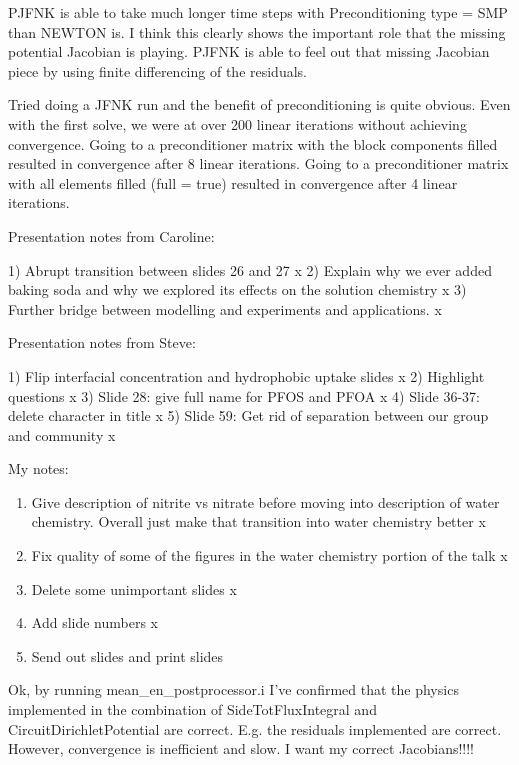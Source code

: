 {PJFNK is able to take much longer time steps with Preconditioning type = SMP than NEWTON is. I think this clearly shows the important role that the missing potential Jacobian is playing. PJFNK is able to feel out that missing Jacobian piece by using finite differencing of the residuals.

Tried doing a JFNK run and the benefit of preconditioning is quite obvious. Even with the first solve, we were at over 200 linear iterations without achieving convergence. Going to a preconditioner matrix with the block components filled resulted in convergence after 8 linear iterations. Going to a preconditioner matrix with all elements filled (full = true) resulted in convergence after 4 linear iterations.

Presentation notes from Caroline:

1) Abrupt transition between slides 26 and 27 x
2) Explain why we ever added baking soda and why we explored its effects on the solution chemistry x
3) Further bridge between modelling and experiments and applications. x

Presentation notes from Steve:

1) Flip interfacial concentration and hydrophobic uptake slides x
2) Highlight questions x
3) Slide 28: give full name for PFOS and PFOA x
4) Slide 36-37: delete character in title x
5) Slide 59: Get rid of separation between our group and community x

My notes:

\begin{enumerate}
\item Give description of nitrite vs nitrate before moving into description of water chemistry. Overall just make that transition into water chemistry better x
\item Fix quality of some of the figures in the water chemistry portion of the talk x
\item Delete some unimportant slides x
\item Add slide numbers x
\item Send out slides and print slides

\end{enumerate}

Ok, by running mean\_en\_postprocessor.i I've confirmed that the physics implemented in the combination of SideTotFluxIntegral and CircuitDirichletPotential are correct. E.g. the residuals implemented are correct. However, convergence is inefficient and slow. I want my correct Jacobians!!!!

}
